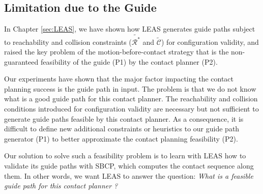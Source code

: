 \subsection{Limitation due to the Guide}

In Chapter \ref{sec:LEAS}, we have shown how LEAS generates guide paths subject to reachability and collision constraints ($\tilde{\mathcal{R}^*}$ and $\tilde{\mathcal{C}}$) for configuration validity, and raised the key problem of the motion-before-contact strategy that is the non-guaranteed feasibility of the guide (P1) by the contact planner (P2).

Our experiments have shown that the major factor impacting the contact planning success is the guide path in input.
The problem is that we do not know what is a good guide path for this contact planner. 
The reachability and collision conditions introduced for configuration validity are necessary but not sufficient to generate guide paths feasible by this contact planner. 
As a consequence, it is difficult to define new additional constraints or heuristics to our guide path generator (P1) to better approximate the contact planning feasibility (P2).

Our solution to solve such a feasibility problem is to learn with LEAS how to validate its guide paths with SBCP, which computes the contact sequence along them. In other words, we want LEAS to answer the question: \textit{What is a feasible guide path for this contact planner ?}





